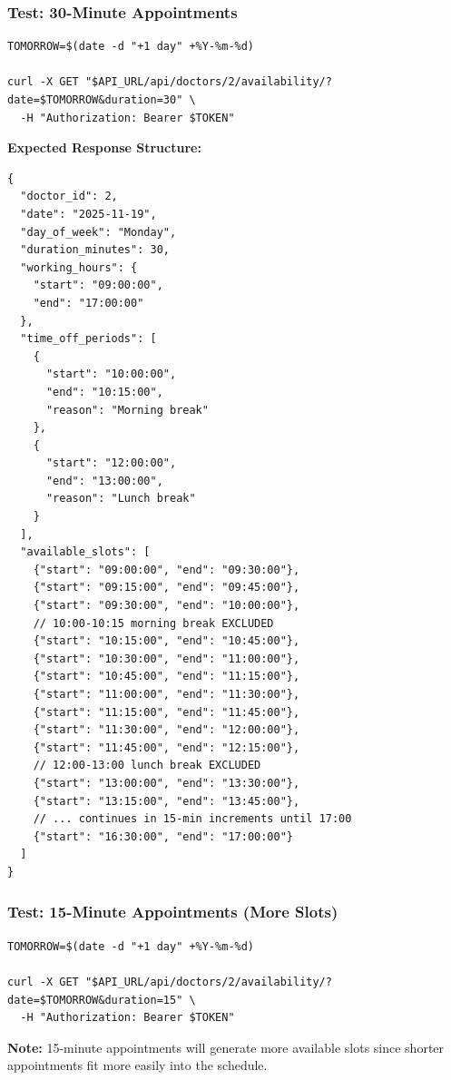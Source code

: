 \documentclass[12pt,a4paper]{article}
\begin{document}
\subsubsection{Test: 30-Minute Appointments}
\begin{lstlisting}[style=bash]
TOMORROW=$(date -d "+1 day" +%Y-%m-%d)

curl -X GET "$API_URL/api/doctors/2/availability/?date=$TOMORROW&duration=30" \
  -H "Authorization: Bearer $TOKEN"
\end{lstlisting}

\textbf{Expected Response Structure:}
\begin{lstlisting}[style=json]
{
  "doctor_id": 2,
  "date": "2025-11-19",
  "day_of_week": "Monday",
  "duration_minutes": 30,
  "working_hours": {
    "start": "09:00:00",
    "end": "17:00:00"
  },
  "time_off_periods": [
    {
      "start": "10:00:00",
      "end": "10:15:00",
      "reason": "Morning break"
    },
    {
      "start": "12:00:00",
      "end": "13:00:00",
      "reason": "Lunch break"
    }
  ],
  "available_slots": [
    {"start": "09:00:00", "end": "09:30:00"},
    {"start": "09:15:00", "end": "09:45:00"},
    {"start": "09:30:00", "end": "10:00:00"},
    // 10:00-10:15 morning break EXCLUDED
    {"start": "10:15:00", "end": "10:45:00"},
    {"start": "10:30:00", "end": "11:00:00"},
    {"start": "10:45:00", "end": "11:15:00"},
    {"start": "11:00:00", "end": "11:30:00"},
    {"start": "11:15:00", "end": "11:45:00"},
    {"start": "11:30:00", "end": "12:00:00"},
    {"start": "11:45:00", "end": "12:15:00"},
    // 12:00-13:00 lunch break EXCLUDED
    {"start": "13:00:00", "end": "13:30:00"},
    {"start": "13:15:00", "end": "13:45:00"},
    // ... continues in 15-min increments until 17:00
    {"start": "16:30:00", "end": "17:00:00"}
  ]
}
\end{lstlisting}

\subsubsection{Test: 15-Minute Appointments (More Slots)}
\begin{lstlisting}[style=bash]
TOMORROW=$(date -d "+1 day" +%Y-%m-%d)

curl -X GET "$API_URL/api/doctors/2/availability/?date=$TOMORROW&duration=15" \
  -H "Authorization: Bearer $TOKEN"
\end{lstlisting}

\textbf{Note:} 15-minute appointments will generate more available slots since shorter appointments fit more easily into the schedule.
\end{document}
